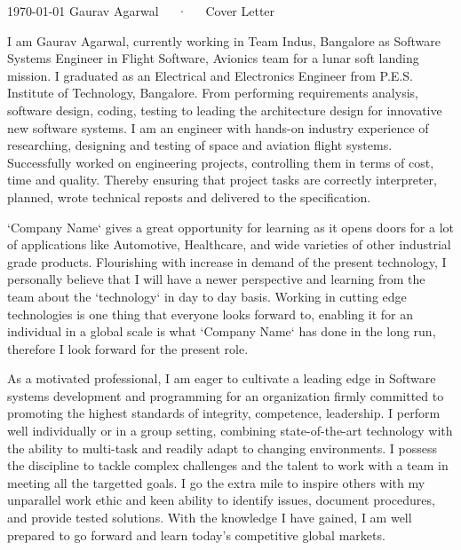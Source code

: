 \documentclass[11pt, a4paper]{awesome-cv}
\begin{document}
\makecvheader[R]

\makecvfooter
  {\today}
  {Gaurav Agarwal~~~·~~~Cover Letter}
  {}

\makelettertitle

\begin{cvletter}


I am Gaurav Agarwal, currently working in Team Indus, Bangalore as Software Systems Engineer in Flight Software, Avionics team for a lunar soft landing mission. I graduated as an Electrical and Electronics Engineer from P.E.S. Institute of Technology, Bangalore. From performing requirements analysis, software design, coding, testing to leading the architecture design for innovative new software systems. I am an engineer with hands-on industry experience of researching, designing and testing of space and aviation flight systems. Successfully worked on engineering projects, controlling them in terms of cost, time and quality. Thereby ensuring that project tasks are correctly interpreter, planned, wrote technical reposts and delivered to the specification.


`Company Name` gives a great opportunity for learning as it opens doors for a lot of applications like Automotive, Healthcare, and wide varieties of other industrial grade products. Flourishing with increase in demand of the present technology, I personally believe that I will have a newer perspective and learning from the team about the `technology` in day to day basis. Working in cutting edge technologies is one thing that everyone looks forward to, enabling it for an individual in a global scale is what `Company Name` has done in the long run, therefore I look forward for the present role.


As a motivated professional, I am eager to cultivate a leading edge in Software systems development and programming for an organization firmly committed to promoting the highest standards of integrity, competence, leadership. I perform well individually or in a group setting, combining state-of-the-art technology with the ability to multi-task and readily adapt to changing environments. I possess the discipline to tackle complex challenges and the talent to work with a team in meeting all the targetted goals. I go the extra mile to inspire others with my unparallel work ethic and keen ability to identify issues, document procedures, and provide tested solutions. With the knowledge I have gained, I am well prepared to go forward and learn today's competitive global markets.


\end{cvletter}
\end{document}
